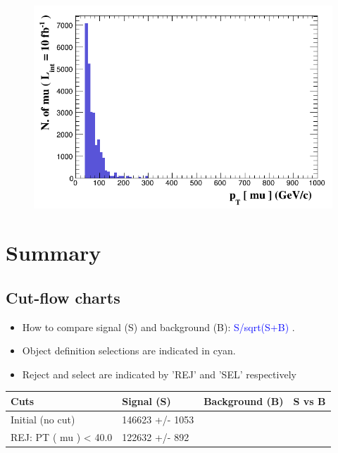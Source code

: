 \documentclass[a4paper, 10pt]{article}
\begin{document}
\begin{figure}[H]
  \begin{center}
    \includegraphics[scale=0.45]{selection_1.png}\\
\caption{   }
  \end{center}
\end{figure}
\newpage
\section{ Summary}

\subsection{Cut-flow charts}

\begin{itemize}
  \item How to compare signal (S) and background (B): \textcolor{blue}{S/\-sqrt(S+B)} .
   \item Object definition selections are indicated in cyan.  \item Reject and select are indicated by 'REJ' and 'SEL' respectively
\end{itemize}
\begin{table}[H]
  \begin{center}
    \begin{tabular}{|m{36.0mm}|m{36.0mm}|m{36.0mm}|m{33.0mm}|}
      \hline
      {\cellcolor{yellow}        Cuts}& {\cellcolor{yellow}         Signal (S)}& {\cellcolor{yellow}         Background (B)}& {\cellcolor{yellow}         S vs B}\\
      \hline
      {\cellcolor{white}         Initial (no cut)}& {\cellcolor{white}         146623 +/\-- 1053}& {\cellcolor{white}         }& {\cellcolor{white}         }\\
      \hline
      {\cellcolor{white} REJ: PT ( mu ) < 40.0}& {\cellcolor{white}         122632 +/\-- 892}& {\cellcolor{white}         }& {\cellcolor{white}         }\\
\hline
    \end{tabular}
  \end{center}
\end{table}
\end{document}
